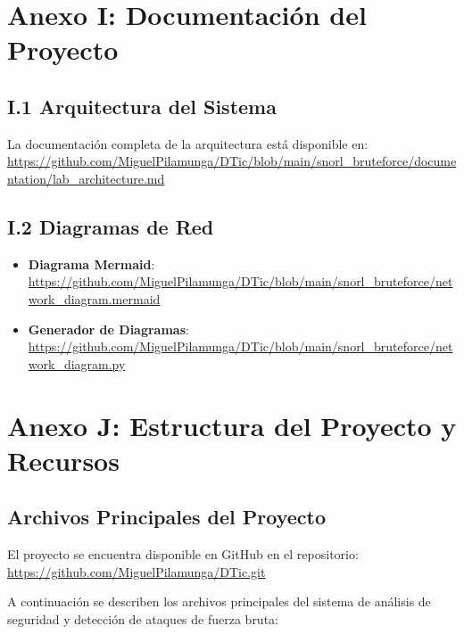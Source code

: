 \section*{Anexo I: Documentación del Proyecto}

\subsection*{I.1 Arquitectura del Sistema}
La documentación completa de la arquitectura está disponible en:
\url{https://github.com/MiguelPilamunga/DTic/blob/main/snorl_bruteforce/documentation/lab_architecture.md}

\subsection*{I.2 Diagramas de Red}
\begin{itemize}
    \item \textbf{Diagrama Mermaid}: \url{https://github.com/MiguelPilamunga/DTic/blob/main/snorl_bruteforce/network_diagram.mermaid}
    \item \textbf{Generador de Diagramas}: \url{https://github.com/MiguelPilamunga/DTic/blob/main/snorl_bruteforce/network_diagram.py}
\end{itemize}

\section*{Anexo J: Estructura del Proyecto y Recursos}

\subsection*{Archivos Principales del Proyecto}

El proyecto se encuentra disponible en GitHub en el repositorio: \url{https://github.com/MiguelPilamunga/DTic.git}

A continuación se describen los archivos principales del sistema de análisis de seguridad y detección de ataques de fuerza bruta:

